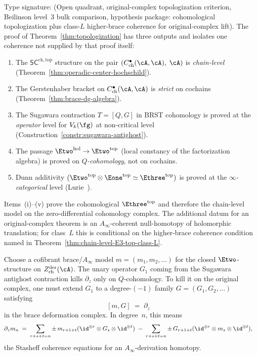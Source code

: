\begin{remark}
\label{rem:topologization-chain-vs-cohomology}
Type signature: \textup{(}Open quadrant, original-complex
topologization criterion, Beilinson level~$3$ bulk comparison,
hypothesis package: cohomological topologization plus class-$L$
higher-brace coherence for original-complex lift\textup{)}.
The proof of Theorem~\ref{thm:topologization} has three
outputs and isolates one coherence not supplied by that proof
itself:
\begin{enumerate}[label=\textup{(\roman*)}]
\item The $\mathsf{SC}^{\mathrm{ch,top}}$ structure on the pair
 $(C^\bullet_{\mathrm{ch}}(\cA,\cA),\;\cA)$ is \emph{chain-level}
 \textup{(}Theorem~\textup{\ref{thm:operadic-center-hochschild}}\textup{)}.
\item The Gerstenhaber bracket on $C^\bullet_{\mathrm{ch}}(\cA,\cA)$ is
 \emph{strict} on cochains
 \textup{(}Theorem~\textup{\ref{thm:brace-dg-algebra}}\textup{)}.
\item The Sugawara contraction
 $T = [Q, G]$ in BRST cohomology is proved at the
 \emph{operator} level for $V_k(\fg)$ at non-critical level
 \textup{(}Construction~\textup{\ref{constr:sugawara-antighost}}\textup{)}.
\item The passage $\Etwo^{\mathrm{hol}} \to \Etwo^{\mathrm{top}}$
 \textup{(}local constancy of the factorization algebra\textup{)} is proved on
 \emph{$Q$-cohomology}, not on cochains.
\item Dunn additivity
 $(\Etwo^{\mathrm{top}} \otimes \Eone^{\mathrm{top}} \simeq \Ethree^{\mathrm{top}})$
 is proved at the \emph{$\infty$-categorical} level
 \textup{(}Lurie~\cite{HA}\textup{)}.
\end{enumerate}
Items~\textup{(i)}--\textup{(v)} prove the cohomological
$\Ethree^{\mathrm{top}}$ and therefore the chain-level model on
the zero-differential cohomology complex. The additional datum
for an original-complex theorem is an $A_\infty$-coherent
null-homotopy of holomorphic translation; for class~$L$ this
is conditional on the higher-brace coherence condition named in
Theorem~\ref{thm:chain-level-E3-top-class-L}.

Choose a cofibrant brace/$A_\infty$ model
$m = (m_1, m_2, \ldots)$ for the closed
$\Etwo$-structure on
$Z^{\mathrm{der}}_{\mathrm{ch}}(\cA)$.
The unary operator $G_1$ coming from the Sugawara
antighost contraction kills $\partial_z$ only on
$Q$-cohomology. To kill it on the original complex, one must
extend $G_1$ to a degree-$(-1)$ family
$G = (G_1, G_2, \ldots)$ satisfying
\[
 [m, G] \;=\; \partial_z
\]
in the brace deformation complex. In degree~$n$, this means
\[
 \partial_z m_n
 \;=\;
 \sum_{r+s+t=n} \pm\,
 m_{r+1+t}
 (\id^{\otimes r}\otimes G_s\otimes \id^{\otimes t})
 \;-\;
 \sum_{r+s+t=n} \pm\,
 G_{r+1+t}
 (\id^{\otimes r}\otimes m_s\otimes \id^{\otimes t}),
 \]
the Stasheff coherence equations for an
$A_\infty$-derivation homotopy.


\end{remark}
